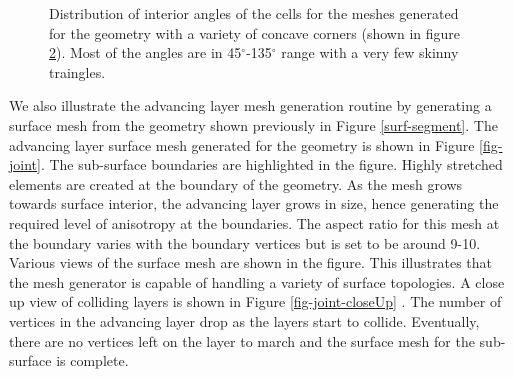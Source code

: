 \documentclass[conf]{new-aiaa}
\begin{document}
\begin{figure}
\begin{subfigure}{0.5\textwidth}
\caption{}
\label{fig-va-dist-high}
\end{subfigure}
\caption{Distribution of interior angles of the cells for the meshes generated for the geometry with a variety of concave corners (shown in figure \ref{fig-variousAngle}). Most of the angles are in 45$^\circ$-135$^\circ$ range with a very few skinny traingles.}
\label{fig-variousAngle}
\end{figure}


We also illustrate the advancing layer mesh generation routine by generating a surface mesh from the geometry shown previously in Figure \ref{surf-segment}. The advancing layer surface mesh generated for the geometry is shown in Figure \ref{fig-joint}. The sub-surface boundaries are highlighted in the figure. Highly stretched elements are created at the boundary of the geometry. As the mesh grows towards surface interior, the advancing layer grows in size, hence generating the required level of anisotropy at the boundaries. The aspect ratio for this mesh at the boundary varies with the boundary vertices but is set to be around 9-10. Various views of the surface mesh are shown in the figure. This illustrates that the mesh generator is capable of handling a variety of surface topologies. A close up view of colliding layers is shown in Figure \ref{fig-joint-closeUp} . The number of vertices in the advancing layer drop as the layers start to collide. Eventually, there are no vertices left on the layer to march and the surface mesh for the sub-surface is complete.
\end{document}

